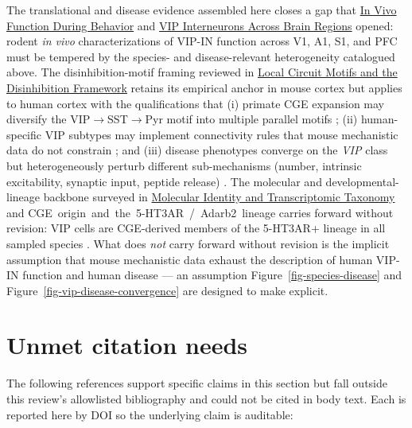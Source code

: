 \documentclass[11pt]{article}
\let\origrightarrow\rightarrow
\def\rightarrow{\ensuremath{\origrightarrow}}
\begin{document}
The translational and disease evidence assembled here closes a gap that
\href{/in-vivo-behavior}{In Vivo Function During Behavior} and \href{/cross-areas}{VIP Interneurons Across Brain Regions} opened: rodent
\textit{in vivo} characterizations of VIP-IN function across V1, A1, S1, and
PFC must be tempered by the species- and disease-relevant heterogeneity
catalogued above. The disinhibition-motif framing reviewed in
\href{/disinhibition-framework}{Local Circuit Motifs and the Disinhibition Framework} retains its empirical anchor in
mouse cortex but applies to human cortex with the qualifications that
(i) primate CGE expansion may diversify the VIP\rightarrow SST\rightarrow Pyr motif \citep{Pi2013} into
multiple parallel motifs \citep{Bakken2021a, Lee2023a, Chartrand2023};
(ii) human-specific VIP subtypes may implement connectivity rules that
mouse mechanistic data do not constrain
\citep{Chartrand2023}; and (iii) disease
phenotypes converge on the \textit{VIP} class but heterogeneously perturb
different sub-mechanisms (number, intrinsic excitability, synaptic
input, peptide release)
\citep{Mossner2020, Chen2023b, Bhandari2024, Goff2023, Hanno2026}.
The molecular and developmental-lineage backbone surveyed in
\href{/classification}{Molecular Identity and Transcriptomic Taxonomy} and CGE~origin~and~the~5-HT3AR~/~Adarb2~lineage carries
forward without revision: VIP cells are CGE-derived members of the
5-HT3AR+ lineage in all sampled species
\citep{Fishell2011, Lodato2011, Mayer2018, Tasic2018, Hodge2019, Yao2023, Tremblay2016, Rudy2011}.
What does \textit{not} carry forward without revision is the implicit
assumption that mouse mechanistic data exhaust the description of human
VIP-IN function and human disease --- an assumption Figure~\ref{fig-species-disease}
and Figure~\ref{fig-vip-disease-convergence} are designed to make
explicit.

\section{Unmet citation needs}

The following references support specific claims in this section but
fall outside this review's allowlisted bibliography and could not be
cited in body text. Each is reported here by DOI so the underlying claim is
auditable:
\end{document}
